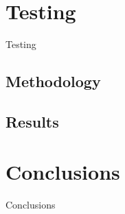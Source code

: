 \documentclass{beamer}
\begin{document}
\section{Testing}

\begin{frame}	
	\begin{Huge}
		\begin{center}
			Testing
		\end{center}
	\end{Huge}
\end{frame}

\subsection{Methodology}


\subsection{Results}

\section{Conclusions}

\begin{frame}	
	\begin{Huge}
		\begin{center}
			Conclusions
		\end{center}
	\end{Huge}
\end{frame}



\end{document}

